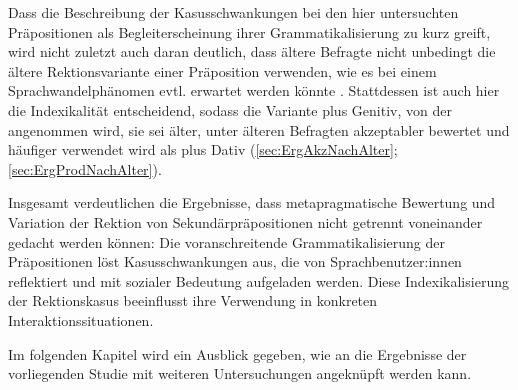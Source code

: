 Dass die Beschreibung der Kasusschwankungen bei den hier untersuchten Präpositionen als Begleiterscheinung ihrer Grammatikalisierung zu kurz greift, wird nicht zuletzt auch daran deutlich, dass ältere Befragte nicht unbedingt die ältere {Rektions\-va\-rian\-te} einer Präposition verwenden, wie es bei einem Sprachwandelphänomen evtl. erwartet werden könnte \citep[s.][40]{Preston.1991}. 
Stattdessen ist auch hier die Indexikalität entscheidend, sodass die Variante \dank{} plus Genitiv, von der angenommen wird, sie sei älter, unter älteren Befragten akzeptabler bewertet und häufiger verwendet wird als \dank{} plus Dativ (\autoref{sec:ErgAkzNachAlter}; \autoref{sec:ErgProdNachAlter}). 

Insgesamt verdeutlichen die Ergebnisse, dass metapragmatische Bewertung %
und Variation %
der Rektion von Sekundärpräpositionen nicht getrennt voneinander gedacht werden können: 
Die voranschreitende Grammatikalisierung der Präpositionen löst Kasusschwankungen aus, die von Sprachbenutzer:innen reflektiert und mit sozialer Bedeutung aufgeladen werden. 
Diese Indexikalisierung der Rektionskasus beeinflusst ihre Verwendung in konkreten Interaktionssituationen. 

Im folgenden Kapitel wird ein Ausblick gegeben, wie an die Ergebnisse der vorliegenden Studie mit weiteren Untersuchungen angeknüpft werden kann. 
